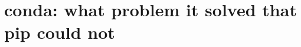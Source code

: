\chapter{conda: what problem it solved that pip could not}
\label{ch:conda-what-problem-it-solved-that-pip}

